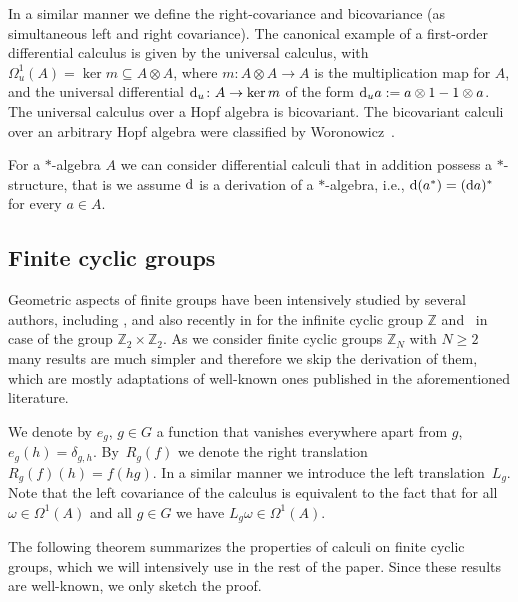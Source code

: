 \documentclass[10pt,a4paper]{amsart}
\numberwithin{equation}{section}
\begin{document}
In a similar manner we define the right-covariance and bicovariance (as simultaneous left and right covariance). The canonical example of a first-order differential calculus is given by the universal calculus, with $\Omega_u^1(A) = \ker m\subseteq A\otimes A$, where $m\colon A\otimes A\rightarrow A$ is the multiplication map for $A$, and the universal differential ${\rm d}_u\colon A \rightarrow \ker m$ of the form ${\rm d}_ua:=a\otimes 1 -1\otimes a$. The universal calculus over a Hopf algebra is bicovariant. The bicovariant calculi over an arbitrary Hopf algebra were classified by Woronowicz~\cite{Wo89}.

For a $\ast$-algebra $A$ we can consider differential calculi that in addition possess a $\ast$-structure, that is we assume ${\rm d}$ is a derivation of a $\ast$-algebra, i.e., ${\rm d}(a^\ast)=({\rm d}a)^\ast$ for every $a\in A$.

\subsection{Finite cyclic groups}

Geometric aspects of finite groups have been intensively studied by several authors, including \cite{BHDS,DMH}, and also
recently in \cite{M1} for the infinite cyclic group $\mathbb{Z}$ and~\cite{M2} in case of the
group $\mathbb{Z}_2\times\mathbb{Z}_2$.
As we consider finite cyclic groups $\mathbb{Z}_N$ with $N\ge 2$ many results are much simpler and therefore we skip the derivation of them, which are mostly adaptations of well-known ones published in the aforementioned literature.

We denote by $e_g$, $g\in G$ a function that vanishes everywhere apart from $g$, $e_g(h) =\delta_{g,h}$.
By~$R_g(f)$ we denote the right translation $R_g(f)(h) = f(hg).$ In a similar manner we introduce the left translation~$L_g$. Note that the left covariance of the calculus is equivalent to the fact that for all $\omega\in \Omega^1(A)$ and
all $g\in G$ we have $L_g\omega\in \Omega^1(A)$.

 The following theorem summarizes the properties of calculi on finite cyclic groups, which we will intensively use in the rest
of the paper. Since these results are well-known, we only sketch the proof.
\end{document}
